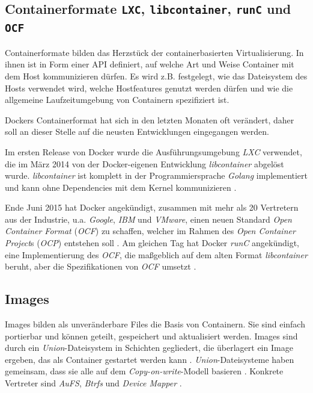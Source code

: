 \documentclass[../main.tex]{subfiles}
\begin{document}

		\subsection{Containerformate \texttt{LXC}, \texttt{libcontainer}, \texttt{runC} und \texttt{OCF}}
		\label{dockerContainerformate}
			Containerformate bilden das Herzstück der containerbasierten Virtualisierung. In ihnen ist in Form einer \acrshort{API} definiert, auf welche Art und Weise Container mit dem Host kommunizieren dürfen. Es wird z.B. festgelegt, wie das Dateisystem des Hosts verwendet wird, welche Hostfeatures genutzt werden dürfen und wie die allgemeine Laufzeitumgebung von Containern spezifiziert ist.

			Dockers Containerformat hat sich in den letzten Monaten oft verändert, daher soll an dieser Stelle auf die neusten Entwicklungen eingegangen werden.

			Im ersten Release von Docker wurde die Ausführungsumgebung \emph{LXC} verwendet, die im März 2014 von der Docker-eigenen Entwicklung \emph{libcontainer} abgelöst wurde. \emph{libcontainer} ist komplett in der Programmiersprache \emph{Golang} implementiert und kann ohne Dependencies mit dem Kernel kommunizieren \cite{dockerLibcontainer}.

			Ende Juni 2015 hat Docker angekündigt, zusammen mit mehr als 20 Vertretern aus der Industrie, u.a. \emph{Google}, \emph{IBM} und \emph{VMware}, einen neuen Standard \emph{Open Container Format} (\emph{\acrshort{OCF}}) zu schaffen, welcher im Rahmen des \emph{Open Container Project}s (\emph{\acrshort{OCP}}) entstehen soll \cite{dockerOCP}. Am gleichen Tag hat Docker \emph{runC} angekündigt, eine Implementierung des \emph{\acrshort{OCF}}, die maßgeblich auf dem alten Format \emph{libcontainer} beruht, aber die Spezifikationen von \emph{\acrshort{OCF}} umsetzt \cite{dockerRunC}\cite{dockerRunCGithub}\cite{runC}.

		\subsection{Images}
    \label{dockerImages}
			Images bilden als unveränderbare Files die Basis von Containern. Sie sind einfach portierbar und können geteilt, gespeichert und aktualisiert werden. Images sind durch ein \emph{Union}-Dateisystem in Schichten gegliedert, die überlagert ein Image ergeben, das als Container gestartet werden kann \cite[S.11]{dockerBook}. \emph{Union}-Dateisysteme haben gemeinsam, dass sie alle auf dem \emph{Copy-on-write}-Modell basieren \cite[S.8]{dockerBook}. Konkrete Vertreter sind \emph{AuFS}, \emph{Btrfs} und \emph{Device Mapper} \cite[S.3]{dockerIntroIEEE}.
\end{document}
